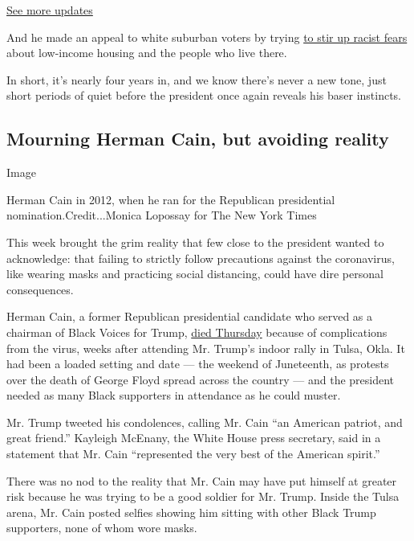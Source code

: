 \href{https://www.nytimes.com/2020/07/31/us/elections/biden-vs-trump.html?action=click\&pgtype=Article\&state=default\&region=MAIN_CONTENT_1\&context=storylines_live_updates}{See
more updates}

And he made an appeal to white suburban voters by trying
\href{https://www.nytimes.com/2020/07/29/us/politics/trump-suburbs-housing-white-voters.html}{to
stir up racist fears} about low-income housing and the people who live
there.

In short, it's nearly four years in, and we know there's never a new
tone, just short periods of quiet before the president once again
reveals his baser instincts.

\hypertarget{mourning-herman-cain-but-avoiding-reality}{%
\subsection{Mourning Herman Cain, but avoiding
reality}\label{mourning-herman-cain-but-avoiding-reality}}

Image

Herman Cain in 2012, when he ran for the Republican presidential
nomination.Credit...Monica Lopossay for The New York Times

This week brought the grim reality that few close to the president
wanted to acknowledge: that failing to strictly follow precautions
against the coronavirus, like wearing masks and practicing social
distancing, could have dire personal consequences.

Herman Cain, a former Republican presidential candidate who served as a
chairman of Black Voices for Trump,
\href{https://www.nytimes.com/2020/07/30/us/politics/herman-cain-dead.html}{died
Thursday} because of complications from the virus, weeks after attending
Mr. Trump's indoor rally in Tulsa, Okla. It had been a loaded setting
and date --- the weekend of Juneteenth, as protests over the death of
George Floyd spread across the country --- and the president needed as
many Black supporters in attendance as he could muster.

Mr. Trump tweeted his condolences, calling Mr. Cain ``an American
patriot, and great friend.'' Kayleigh McEnany, the White House press
secretary, said in a statement that Mr. Cain ``represented the very best
of the American spirit.''

There was no nod to the reality that Mr. Cain may have put himself at
greater risk because he was trying to be a good soldier for Mr. Trump.
Inside the Tulsa arena, Mr. Cain posted selfies showing him sitting with
other Black Trump supporters, none of whom wore masks.

